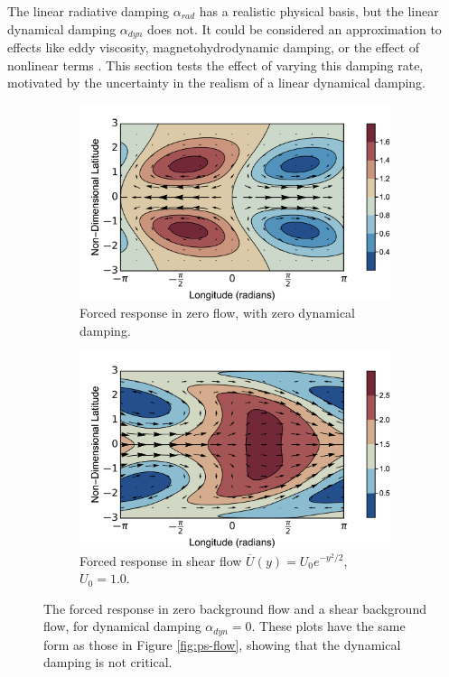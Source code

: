 The linear radiative damping $\alpha_{rad}$ has a realistic physical basis, but the linear dynamical damping $\alpha_{dyn}$ does not. It could be considered an approximation to effects like eddy viscosity, magnetohydrodynamic damping, or the effect of nonlinear terms \citep{heng2014analytical}. This section tests the effect of varying this damping rate, motivated by the uncertainty in the realism of a linear dynamical damping.

\begin{figure}
  \centering
  \begin{subfigure}[t]{0.48\textwidth}
    \includegraphics[width=\textwidth]{figures/wave-mean-flow/zero-alpha-dyn-zero-flow.png}
    \caption{Forced response in zero flow, with zero dynamical damping.}
    \label{fig:zero-alpha-dyn-zero-flow}
  \end{subfigure}
\quad
  \begin{subfigure}[t]{0.48\textwidth}
    \includegraphics[width=\textwidth]{figures/wave-mean-flow/zero-alpha-dyn-1-flow.png}
    \caption{Forced response in shear flow $\overline{U}(y) =  U_{0} e^{-y^{2}/2}$, $U_{0}=1.0$.}
    \label{fig:zero-alpha-dyn-1-flow}
  \end{subfigure}
  \caption{The forced response in zero background flow and a shear background flow, for dynamical damping $\alpha_{dyn}=0$. These plots have the same form as those in Figure \ref{fig:ps-flow}, showing that the dynamical damping is not critical.}
  \label{fig:zero-alpha-dyn-flow}
\end{figure}

